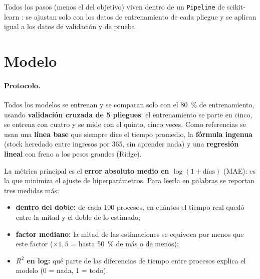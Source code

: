 \documentclass[11pt,a4paper]{article}
\begin{document}
Todos los pasos (menos el del objetivo) viven dentro de un \texttt{Pipeline} de scikit-learn \cite{sklearn}: se ajustan
solo con los datos de entrenamiento de cada pliegue y se aplican igual a los datos de validación y de prueba.

\begin{table}[H]
  \centering\footnotesize
  \caption{Las \nCompleta{} variables del modelo: \nOriginales{} originales, \nIngenieria{} de ingeniería y
  \nHistoricas{} histórica, con su conversión y su correlación de Spearman con el objetivo (las categóricas no tienen).
  Notebook 19.}
  \label{tab:variables}
  \resizebox{\linewidth}{!}{}
\end{table}

\section{Modelo}

\paragraph{Protocolo.} Todos los modelos se entrenan y se comparan solo con el 80~\% de entrenamiento, usando
\textbf{validación cruzada de 5 pliegues}: el entrenamiento se parte en cinco, se entrena con cuatro y se mide con el
quinto, cinco veces. Como referencias se usan una \textbf{línea base} que siempre dice el tiempo promedio, la
\textbf{fórmula ingenua} (stock heredado entre ingresos por 365, sin aprender nada) y una \textbf{regresión lineal} con
freno a los pesos grandes (Ridge).

\begin{idea}[title={Cómo se mide el error}]
La métrica principal es el \textbf{error absoluto medio en $\log(1+\text{días})$} (MAE): es la que minimiza el ajuste de
hiperparámetros. Para leerla en palabras se reportan tres medidas más:
\begin{itemize}
  \item \textbf{dentro del doble:} de cada 100 procesos, en cuántos el tiempo real quedó entre la mitad y el doble de lo
  estimado;
  \item \textbf{factor mediano:} la mitad de las estimaciones se equivoca por menos que este factor ($\times1{,}5$ = hasta
  50~\% de más o de menos);
  \item \textbf{$R^2$ en log:} qué parte de las diferencias de tiempo entre procesos explica el modelo (0 = nada, 1 = todo).
\end{itemize}
\end{idea}
\end{document}
